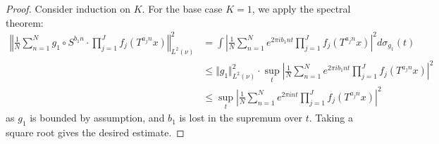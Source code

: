 \documentclass[11pt, oneside]{amsart}   	%
\newcommand{\1}{\mathbbm{1}}
\theoremstyle{definition}
\begin{document}
\begin{proof}
Consider induction on $K$. For the base case $K=1$, we apply the spectral theorem:
\begin{align*}
\left\Vert\frac{1}{N} \sum_{n=1}^N g_1 \circ S^{b_1 n} \cdot \prod_{j=1}^J f_j(T^{a_jn}x)\right\Vert_{L^2(\nu)}^{2} &=  \int \left| \frac{1}{N} \sum_{n=1}^N e^{2\pi i b_1 n t}  \prod_{j=1}^J f_j(T^{a_jn}x)\right|^{2} d\sigma_{g_1}(t) \\
&\leq \Vert g_1 \Vert_{L^2(\nu)}^2 \cdot \sup_{t} \left|  \frac{1}{N} \sum_{n=1}^N e^{2\pi i b_1 n t}  \prod_{j=1}^J f_j(T^{a_jn}x)\right|^2 \\
&\leq \sup_{t} \left|  \frac{1}{N} \sum_{n=1}^N e^{2\pi i n t}  \prod_{j=1}^J f_j(T^{a_jn}x)\right|^2
\end{align*}
as $g_1$ is bounded by assumption, and $b_1$ is lost in the supremum over $t$. Taking a square root gives the desired estimate.


\end{proof}
\end{document}
